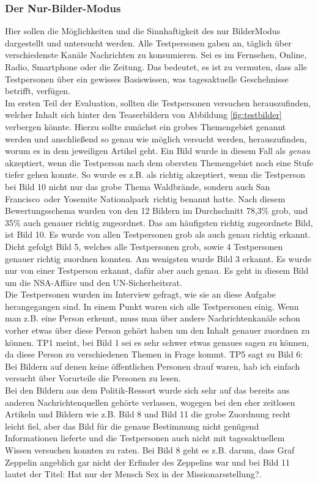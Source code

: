 \documentclass[12pt,a4paper,bibtotoc,abstracton]{scrartcl}
\begin{document}
\subsubsection{Der \glqq Nur-Bilder-Modus\grqq\ }
\label{subsubsec:nurbildermodus}
Hier sollen die Möglichkeiten und die Sinnhaftigkeit des \glqq nur Bilder\grqq Modus dargestellt und untersucht werden. Alle Testpersonen gaben an, täglich über verschiedenste Kanäle Nachrichten zu konsumieren. Sei es im Fernsehen, Online, Radio, Smartphone oder die Zeitung. Das bedeutet, es ist zu vermuten, dass alle Testpersonen über ein gewisses Basiswissen, was tagesaktuelle Geschehnisse betrifft, verfügen.\\
Im ersten Teil der Evaluation, sollten die Testpersonen versuchen herauszufinden, welcher Inhalt sich hinter den Teaserbildern von Abbildung \ref{fig:testbilder} verbergen könnte. Hierzu sollte zunächst ein grobes Themengebiet genannt werden und anschließend so genau wie möglich versucht werden, herauszufinden, worum es in dem jeweiligen Artikel geht. Ein Bild wurde in diesem Fall als \textit{genau} akzeptiert, wenn die Testperson nach dem obersten Themengebiet noch eine Stufe tiefer gehen konnte. So wurde es z.B. als richtig akzeptiert, wenn die Testperson bei Bild 10 nicht nur das grobe Thema \glqq Waldbrände\grqq, sondern auch \glqq San Francisco\grqq\ oder \glqq Yosemite Nationalpark\grqq\ richtig benannt hatte. Nach diesem Bewertungsschema wurden von den 12 Bildern im Durchschnitt 78,3\% grob, und 35\% auch genauer richtig zugeordnet. Das am häufigsten richtig zugeordnete Bild, ist Bild 10. Es wurde von allen Testpersonen grob als auch genau richtig erkannt. Dicht gefolgt Bild 5, welches alle Testpersonen grob, sowie 4 Testpersonen genauer richtig zuordnen konnten. Am wenigsten wurde Bild 3 erkannt. Es wurde nur von einer Testperson erkannt, dafür aber auch genau. Es geht in diesem Bild um die NSA-Affäre und den UN-Sicherheitsrat.\\
Die Testpersonen wurden im Interview gefragt, wie sie an diese Aufgabe herangegangen sind. In einem Punkt waren sich alle Testpersonen einig. Wenn man z.B. eine Person erkennt, muss man über andere Nachrichtenkanäle schon vorher etwas über diese Person gehört haben um den Inhalt genauer zuordnen zu können. TP1 meint, bei Bild 1 sei es sehr schwer etwas genaues sagen zu können, da diese Person zu verschiedenen Themen in Frage kommt. TP5 sagt zu Bild 6: \glqq Bei Bildern auf denen keine öffentlichen Personen drauf waren, hab ich einfach versucht über Vorurteile die Personen zu lesen\grqq. \\
Bei den Bildern aus dem Politik-Ressort wurde sich sehr auf das bereits aus anderen Nachrichtenquellen gehörte verlassen, wogegen bei den eher zeitlosen Artikeln und Bildern wie z.B. Bild 8 und Bild 11 die grobe Zuordnung recht leicht fiel, aber das Bild für die genaue Bestimmung nicht genügend Informationen lieferte und die Testpersonen auch nicht mit tagesaktuellem Wissen versuchen konnten zu raten. Bei Bild 8 geht es z.B. darum, dass Graf Zeppelin angeblich gar nicht der Erfinder des Zeppelins war und bei Bild 11 lautet der Titel: \glqq Hat nur der Mensch Sex in der Missionarsstellung?\grqq. \\
\end{document}
